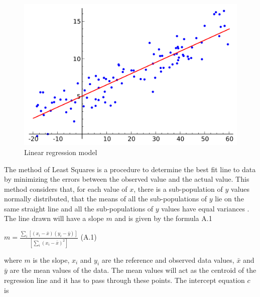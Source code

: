 \begin{figure}[h]
    \begin{center}
    \includegraphics[scale=0.25]{./images/figure9.png} 
    \end{center}
    \caption{Linear regression model \cite{regression}}
    \label{LRM}
  \end{figure}
  The method of Least Squares is a procedure to determine the best fit line to data\cite{S.Miller1992} by minimizing the errors between the observed value and the actual value. This method considers that, for each value of $x$, there is a sub-population of $y$ values normally distributed, that the means of all the sub-populations of $y$ lie on the same straight line and all the sub-populations of $y$ values have equal variances \cite{Almeida2002} \cite{daniel2018biostatistics}.
  The line drawn will have a slope $m$ and is given by the formula A.1
\begin{center}



      {\large  $ m = \frac{\sum_{i}[(x_i-\bar{x})(y_i-\bar{y})]}{[ \sum_{i}(x_i-\bar{x})^2 ]}$}  \hspace{3cm}(A.1)
  

   


\end{center}



where $m$ is the slope, $x_i$ and $y_i$ are the reference and observed data values, $\bar{x}$ and $\bar{y}$ are the mean values of the data. The mean values will act as the centroid of the regression line and it has to pass through these points.
The intercept equation $c$ is

